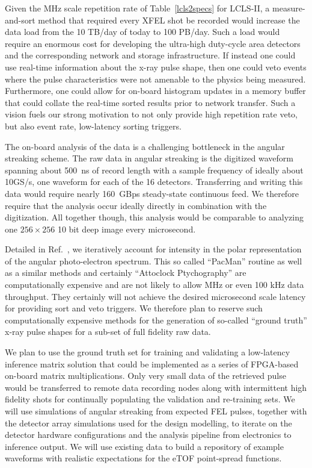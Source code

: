 
Given the MHz scale repetition rate of Table~\ref{lcls2specs} for LCLS-II, a measure-and-sort method that required every XFEL shot be recorded would increase the data load from the 10 TB/day of today to 100 PB/day.
Such a load would require an enormous cost for developing the ultra-high duty-cycle area detectors and the corresponding network and storage infrastructure. 
If instead one could use real-time information about the x-ray pulse shape, then one could veto events where the pulse characteristics were not amenable to the physics being measured.
Furthermore, one could allow for on-board histogram updates in a memory buffer that could collate the real-time sorted results prior to network transfer.
Such a vision fuels our strong motivation to not only provide high repetition rate veto, but also event rate, low-latency sorting triggers.

The on-board analysis of the data is a challenging bottleneck in the angular streaking scheme.
The raw data in angular streaking is the digitized waveform spanning about 500~ns of record length with a sample frequency of ideally about 10GS/s, one waveform for each of the 16 detectors.
Transferring and writing this data would require nearly 160~GBps steady-state continuous feed.
We therefore require that the analysis occur ideally directly in combination with the digitization.
All together though, this analysis would be comparable to analyzing one $256\times256$ 10 bit deep image every microsecond.

Detailed in Ref.~\cite{Nick2018}, we iteratively account for intensity in the polar representation of the angular photo-electron spectrum.
This so called ``PacMan'' routine as well as a similar methods \cite{Thomas2015,Siqi2018,HJWorner2018} and certainly ``Attoclock Ptychography'' \cite{Thomas2018} are computationally expensive and are not likely to allow MHz or even 100 kHz data throughput.
They certainly will not achieve the desired microsecond scale latency for providing sort and veto triggers.
We therefore plan to reserve such computationally expensive methods for the generation of so-called ``ground truth'' x-ray pulse shapes for a sub-set of full fidelity raw data.

We plan to use the ground truth set for training and validating a low-latency inference matrix solution that could be implemented as a series of FPGA-based on-board matrix multiplications.
Only very small data of the retrieved pulse would be transferred to remote data recording nodes along with intermittent high fidelity shots for continually populating the validation and re-training sets.
We will use simulations of angular streaking from expected FEL pulses, together with the detector array simulations used for the design modelling, to iterate on the detector hardware configurations and the analysis pipeline from electronics to inference output.
We will use existing data to build a repository of example waveforms with realistic expectations for the eTOF point-spread functions.  

